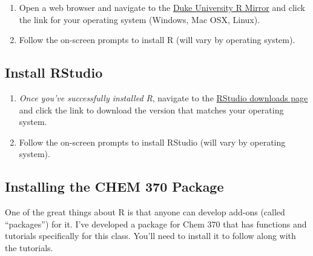 \documentclass[]{tufte-book}
\providecommand{\tightlist}{%
  \setlength{\itemsep}{0pt}\setlength{\parskip}{0pt}}
\begin{document}
\begin{enumerate}
\def\labelenumi{\arabic{enumi}.}
\tightlist
\item
  Open a web browser and navigate to the \href{http://archive.linux.duke.edu/cran/}{Duke University R Mirror} and click the link for your operating system (Windows, Mac OSX, Linux).\\
\item
  Follow the on-screen prompts to install R (will vary by operating system).
\end{enumerate}

\hypertarget{install-rstudio}{%
\subsection{Install RStudio}\label{install-rstudio}}

\begin{enumerate}
\def\labelenumi{\arabic{enumi}.}
\tightlist
\item
  \emph{Once you've successfully installed R}, navigate to the \href{https://rstudio.com/products/rstudio/download/\#download}{RStudio downloads page} and click the link to download the version that matches your operating system.\\
\item
  Follow the on-screen prompts to install RStudio (will vary by operating system).
\end{enumerate}

\hypertarget{installing-c370-package}{%
\subsection{Installing the CHEM 370 Package}\label{installing-c370-package}}

One of the great things about R is that anyone can develop add-ons (called ``packages'') for it. I've developed a package for Chem 370 that has functions and tutorials specifically for this class. You'll need to install it to follow along with the tutorials.
\end{document}
